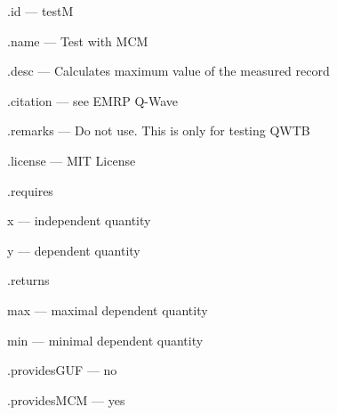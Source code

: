 \begin{tightdesc}
\item [\textsf{.id}] --- testM
\item [\textsf{.name}] --- Test with MCM
\item [\textsf{.desc}] --- Calculates maximum value of the measured record
\item [\textsf{.citation}] --- see EMRP Q-Wave
\item [\textsf{.remarks}] --- Do not use. This is only for testing QWTB
\item [\textsf{.license}] --- MIT License
\item [\textsf{.requires}] \rule{0em}{0em}
\begin{tightdesc}
\item [\textsf{x}] --- independent quantity
\item [\textsf{y}] --- dependent quantity
\end{tightdesc}
\item [\textsf{.returns}] \rule{0em}{0em}
\begin{tightdesc}
\item [\textsf{max}] --- maximal dependent quantity
\item [\textsf{min}] --- minimal dependent quantity
\end{tightdesc}
\item [\textsf{.providesGUF}] --- no
\item [\textsf{.providesMCM}] ---  yes
\end{tightdesc}

